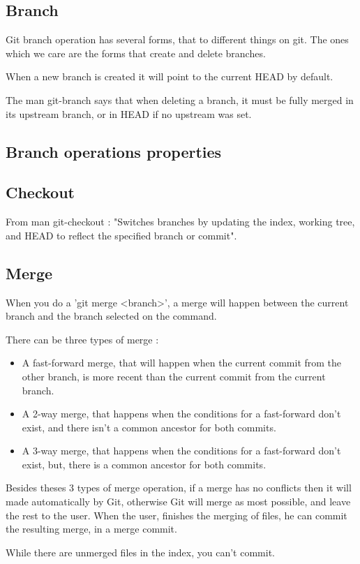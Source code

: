 \subsection{Branch}

Git branch operation has several forms, that to different things on git.
The ones which we care are the forms that create and delete branches. \par
When a new branch is created it will point to the current HEAD by default.
\par


The man git-branch says that when deleting a branch, it must be fully
merged in its upstream branch, or in HEAD if no upstream was set. \par

\subsection{Branch operations properties }


\subsection{Checkout}

From man git-checkout : "Switches branches by updating the index, 
working tree, and HEAD to reflect the specified branch or commit". \par

\subsection{Merge}

When you do a 'git merge <branch>', a merge will happen between the current
branch and the branch selected on the command. \par
There can be three types of merge : 
\begin{itemize}
\item A fast-forward merge, that will happen when 
the current commit from the other
branch, is more recent than the current commit from the current branch.
\item A 2-way merge, that happens when the conditions for a fast-forward
don't exist, and there isn't a common ancestor for both commits.
\item A 3-way merge, that happens when the conditions for a fast-forward
don't exist, but, there is a common ancestor for both commits.
\end{itemize}
Besides theses 3 types of merge operation, if a merge has no conflicts then
it will made automatically by Git, otherwise Git will merge as most possible,
and leave the rest to the user. When the user, finishes the merging of files, he
can commit the resulting merge, in a merge commit. \par
While there are unmerged files in the index, you can't commit.
